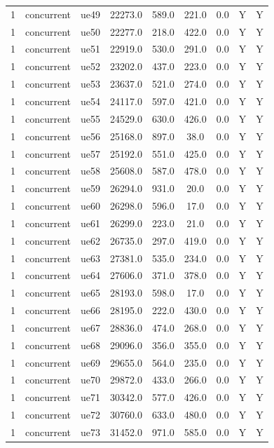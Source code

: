 \begin{table}[ht]
\begin{tabular}{|c|c|c|c|c|c|c|c|c|}
1 & concurrent & ue49 & 22273.0 & 589.0 & 221.0 & 0.0 & Y & Y \\
1 & concurrent & ue50 & 22277.0 & 218.0 & 422.0 & 0.0 & Y & Y \\
1 & concurrent & ue51 & 22919.0 & 530.0 & 291.0 & 0.0 & Y & Y \\
1 & concurrent & ue52 & 23202.0 & 437.0 & 223.0 & 0.0 & Y & Y \\
1 & concurrent & ue53 & 23637.0 & 521.0 & 274.0 & 0.0 & Y & Y \\
1 & concurrent & ue54 & 24117.0 & 597.0 & 421.0 & 0.0 & Y & Y \\
1 & concurrent & ue55 & 24529.0 & 630.0 & 426.0 & 0.0 & Y & Y \\
1 & concurrent & ue56 & 25168.0 & 897.0 & 38.0 & 0.0 & Y & Y \\
1 & concurrent & ue57 & 25192.0 & 551.0 & 425.0 & 0.0 & Y & Y \\
1 & concurrent & ue58 & 25608.0 & 587.0 & 478.0 & 0.0 & Y & Y \\
1 & concurrent & ue59 & 26294.0 & 931.0 & 20.0 & 0.0 & Y & Y \\
1 & concurrent & ue60 & 26298.0 & 596.0 & 17.0 & 0.0 & Y & Y \\
1 & concurrent & ue61 & 26299.0 & 223.0 & 21.0 & 0.0 & Y & Y \\
1 & concurrent & ue62 & 26735.0 & 297.0 & 419.0 & 0.0 & Y & Y \\
1 & concurrent & ue63 & 27381.0 & 535.0 & 234.0 & 0.0 & Y & Y \\
1 & concurrent & ue64 & 27606.0 & 371.0 & 378.0 & 0.0 & Y & Y \\
1 & concurrent & ue65 & 28193.0 & 598.0 & 17.0 & 0.0 & Y & Y \\
1 & concurrent & ue66 & 28195.0 & 222.0 & 430.0 & 0.0 & Y & Y \\
1 & concurrent & ue67 & 28836.0 & 474.0 & 268.0 & 0.0 & Y & Y \\
1 & concurrent & ue68 & 29096.0 & 356.0 & 355.0 & 0.0 & Y & Y \\
1 & concurrent & ue69 & 29655.0 & 564.0 & 235.0 & 0.0 & Y & Y \\
1 & concurrent & ue70 & 29872.0 & 433.0 & 266.0 & 0.0 & Y & Y \\
1 & concurrent & ue71 & 30342.0 & 577.0 & 426.0 & 0.0 & Y & Y \\
1 & concurrent & ue72 & 30760.0 & 633.0 & 480.0 & 0.0 & Y & Y \\
1 & concurrent & ue73 & 31452.0 & 971.0 & 585.0 & 0.0 & Y & Y \\

\end{tabular}
\end{table}
